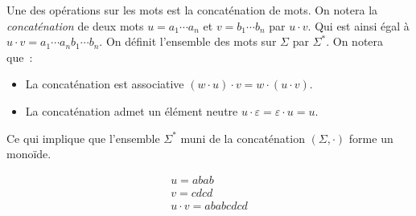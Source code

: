 \begin{definition}
    Une des opérations sur les mots est la concaténation de mots. On notera la
    \textit{concaténation} de deux mots \(u = a_1 \cdots a_n\) et \(v = b_1
    \cdots b_n\) par \(u \cdot v\). Qui est ainsi égal à \(u \cdot v = a_1
    \cdots a_n b_1 \cdots b_n\). On définit l'ensemble des mots sur \(\Sigma\)
    par \(\Sigma ^ *\). On notera que~:

    \begin{itemize}[label=\textbullet]
        \item La concaténation est associative \((w \cdot u) \cdot v = w \cdot
              (u \cdot v)\).
        \item La concaténation admet un élément neutre \(u \cdot \varepsilon =
              \varepsilon \cdot u = u\).
    \end{itemize}

    \noindent Ce qui implique que l'ensemble \(\Sigma ^ *\) muni de la concaténation
    \((\Sigma, \cdot)\) forme un monoïde.
\end{definition}

\begin{example}
    \begin{gather*}
        u = abab \\
        v = cdcd \\
        u \cdot v = ababcdcd
    \end{gather*}
\end{example}



